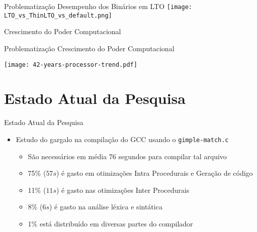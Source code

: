 \begin{frame}{Problematização}
    Desempenho dos Binários em LTO \citep{Johnson:2017:TSI:3049832.3049845}
    \texttt{[image: LTO\_vs\_ThinLTO\_vs\_default.png]}
    \label{fig:performance_lto}
\end{frame}

\begin{frame}[standout]
    Crescimento do Poder Computacional
\end{frame}

\begin{frame}{Problematização}
    Crescimento do Poder Computacional \citep{42years}

    \centering
    \texttt{[image: 42-years-processor-trend.pdf]}
    \label{fig:42years}
\end{frame}

\section{Estado Atual da Pesquisa}

\begin{frame}{Estado Atual da Pesquisa}
    \begin{itemize}
        \item Estudo do gargalo na compilação do GCC usando o \texttt{gimple-match.c}
            \begin{itemize}
                \item São necessários em média 76 segundos para compilar tal arquivo
                \item 75\% ($57s$) é gasto em otimizações Intra Procedurais e Geração de código
                \item 11\% ($11s$) é gasto nas otimizações Inter Procedurais
                \item 8\% ($6s$) é gasto na análise léxica e sintática
                \item 1\% está distribuído em diversas partes do compilador
            \end{itemize}
    \end{itemize}
\end{frame}

